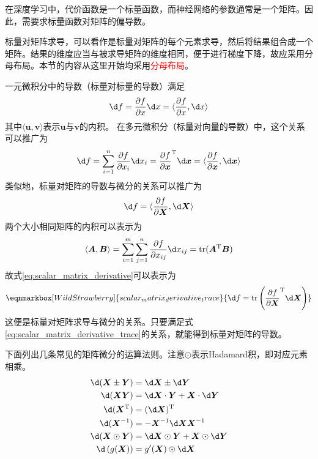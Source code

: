 在深度学习中，代价函数是一个标量函数，而神经网络的参数通常是一个矩阵。因此，需要求标量函数对矩阵的偏导数。

标量对矩阵求导，可以看作是标量对矩阵的每个元素求导，然后将结果组合成一个矩阵。结果的维度应当与被求导矩阵的维度相同，便于进行梯度下降，故应采用分母布局。本节的内容从这里开始均采用\textcolor{red}{分母布局}。

一元微积分中的导数（标量对标量的导数）满足
\begin{equation}
	\d f 
	= \frac{\partial f}{\partial x}\d x
	= \langle \frac{\partial f}{\partial x}, \d x \rangle
\end{equation}
其中$\langle \bm{u}, \bm{v} \rangle$表示$\bm{u}$与$\bm{v}$的内积。
在多元微积分（标量对向量的导数）中，这个关系可以推广为
\begin{equation}
	\d f
	= \sum_{i=1}^{n}{\frac{\partial f}{\partial x_i}\d x_i} 
	= {\frac{\partial f}{\partial \bm{x}}}^{\mathrm{T}}\d \bm{x}
	= \langle \frac{\partial f}{\partial \bm{x}}, \d \bm{x} \rangle
\end{equation}
类似地，标量对矩阵的导数与微分的关系可以推广为
\begin{equation}
	\d f
	= \langle \frac{\partial f}{\partial \bm{X}}, \d \bm{X} \rangle
	\label{eq:scalar_matrix_derivative}
\end{equation}
两个大小相同矩阵的内积可以表示为
\begin{equation}
	\langle \bm{A}, \bm{B} \rangle 
	= \sum_{i=1}^{m}{\sum_{j=1}^{n}{\frac{\partial f}{\partial x_{ij}}\d x_{ij}}} 
	= \mathrm{tr}(\bm{A}^{\mathrm{T}}\bm{B})
\end{equation}
故式\eqref{eq:scalar_matrix_derivative}可以表示为
\begin{equation}
	\eqnmarkbox[WildStrawberry]{scalar_matrix_derivative_trace}{
	\d f 
	= \mathrm{tr}\left({\frac{\partial f}{\partial \bm{X}}}^{\mathrm{T}}\d \bm{X}\right)
	}
	\label{eq:scalar_matrix_derivative_trace}
\end{equation}
这便是标量对矩阵求导与微分的关系。只要满足式\eqref{eq:scalar_matrix_derivative_trace}的关系，就能得到标量对矩阵的导数。

下面列出几条常见的矩阵微分的运算法则。注意$\odot$表示Hadamard积，即对应元素相乘。
\begin{subequations}
	\begin{align}
		\d (\bm{X}\pm \bm{Y}) &= \d \bm{X} \pm \d \bm{Y} 
		\label{eq:matrix_derivative_add_sub} \\
		\d (\bm{XY}) &= \d \bm{X}\cdot \bm{Y} + \bm{X}\cdot \d \bm{Y}
		\label{eq:matrix_derivative_mul} \\
		\d (\bm{X}^{\mathrm{T}}) &= (\d \bm{X})^{\mathrm{T}}
		\label{eq:matrix_derivative_transpose} \\
		\d (\bm{X}^{-1}) &= -\bm{X}^{-1}\d \bm{X}\bm{X}^{-1}
		\label{eq:matrix_derivative_inverse} \\
		\d (\bm{X}\odot \bm{Y}) &= \d \bm{X}\odot \bm{Y} + \bm{X}\odot \d \bm{Y}
		\label{eq:matrix_derivative_hadamard} \\
		\d \left(g(\bm{X})\right) &= g'(\bm{X}) \odot \d \bm{X}
		\label{eq:matrix_derivative_hadamard2}
	\end{align}
\end{subequations}

